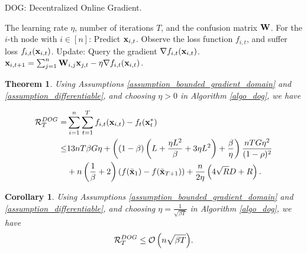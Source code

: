 \documentclass{article}
\newtheorem{Theorem}{\bf{Theorem}}
\newtheorem{Corollary}{\bf{Corollary}}
\begin{document}
\newcommand\StateX{\Statex\hspace{\algorithmicindent}}
\begin{algorithm}[!]
   \caption{DOG: Decentralized Online Gradient.}
   \label{algo_dog}
   \begin{algorithmic}[1]
   \Require The learning rate $\eta$, number of iterations $T$, and the confusion matrix ${\bf W}$.
           \StateX For the $i$-th node with $i\in[n]$:
            \State \indent Predict ${\bf x}_{i,t}$.
            \State \indent Observe the loss function $f_{i,t}$,
            \StateX \indent and suffer loss $f_{i,t}({\bf x}_{i,t})$.
            \StateX Update:
            \State \indent Query the gradient $\nabla f_{i,t}({\bf x}_{i,t})$.  
            \State \indent ${\bf x}_{i,t+1} = \sum_{j=1}^n {\bf W}_{i,j}{\bf x}_{j,t} - \eta \nabla f_{i,t}({\bf x}_{i,t})$. 
       \EndFor
   \end{algorithmic}
\end{algorithm}










\begin{Theorem}
\label{theorem_regret_upper_bound}
Using Assumptions \ref{assumption_bounded_gradient_domain} and \ref{assumption_differentiable}, and choosing $\eta>0$ in Algorithm \ref{algo_dog}, we have

\begin{align}
\nonumber
{\mathcal{R}}_T^{DOG} = & \sum_{i=1}^n\sum_{t=1}^T f_{i,t}({\bf x}_{i,t}) - f_t({\bf x}_t^\ast) \\ \nonumber
\le & 13nT\beta G \eta + \left(  (1-\beta)  \left(  L + \frac{\eta L^2}{\beta} + 3\eta L^2  \right) + \frac{\beta}{\eta}  \right) \frac{nT G \eta^2}{(1-\rho)^2} \\ \nonumber 
&+ n\left( \frac{1}{\beta} + 2 \right)\left( f(\bar{{\bf x}}_1) - f(\bar{{\bf x}}_{T+1}) \right)   + \frac{n}{2\eta}\left(  4\sqrt{R}D + R   \right).
\end{align}


\end{Theorem}


\begin{Corollary}
Using Assumptions \ref{assumption_bounded_gradient_domain} and \ref{assumption_differentiable}, and choosing $\eta = \frac{1}{\sqrt{\beta T}}$ in Algorithm \ref{algo_dog}, we have
\begin{align}
\nonumber
{\mathcal{R}}_T^{DOG} \le {\mathcal{O}\left( n\sqrt{\beta T} \right)}.
\end{align}




\end{Corollary}
\end{document}
